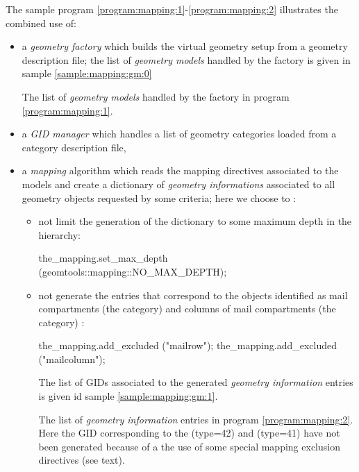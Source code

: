 The   sample  program  \ref{program:mapping:1}-\ref{program:mapping:2}
illustrates the combined use of:
\begin{itemize}

\item  a \emph{geometry  factory}  which builds  the virtual  geometry
  setup from  a geometry description file; the  list of \emph{geometry
    models}   handled   by   the    factory   is   given   in   sample
  \ref{sample:mapping:gm:0}

\begin{sample}[h]
\caption{The list of \emph{geometry  models} handled by the factory in
  program \ref{program:mapping:1}.}
\label{sample:mapping:gm:0}
\end{sample}

\item a \emph{GID manager} which handles a list of geometry categories
  loaded from a category description file,

\item a  \emph{mapping} algorithm  which reads the  mapping directives
  associated to  the models and create a  dictionary of \emph{geometry
    informations} associated to all geometry objects requested by some
  criteria; here we choose to :
  \begin{itemize}
    \item not limit  the generation of the dictionary  to some maximum
      depth in the hierarchy:
      \begin{CppVerbatim}
the_mapping.set_max_depth (geomtools::mapping::NO_MAX_DEPTH);
      \end{CppVerbatim}
    \item  not generate  the entries  that correspond  to  the objects
      identified as mail  compartments (the  category) and
      columns of mail compartments (the  category) :
     \begin{CppVerbatim}
the_mapping.add_excluded ("mailrow");
the_mapping.add_excluded ("mailcolumn");
      \end{CppVerbatim}

     The  list  of GIDs  associated  to  the generated  \emph{geometry
       information}      entries      is      given     id      sample
     \ref{sample:mapping:gm:1}.

     \begin{sample}[h]
       \caption{The  list of  \emph{geometry  information} entries  in
         program  \ref{program:mapping:2}. Here the  GID corresponding
         to the   (type=42) and   (type=41)
         have not been generated because of a the use of 
         some special mapping  exclusion directives (see text).}
       \label{sample:mapping:gm:1}
     \end{sample}


\end{itemize}
\end{itemize}
